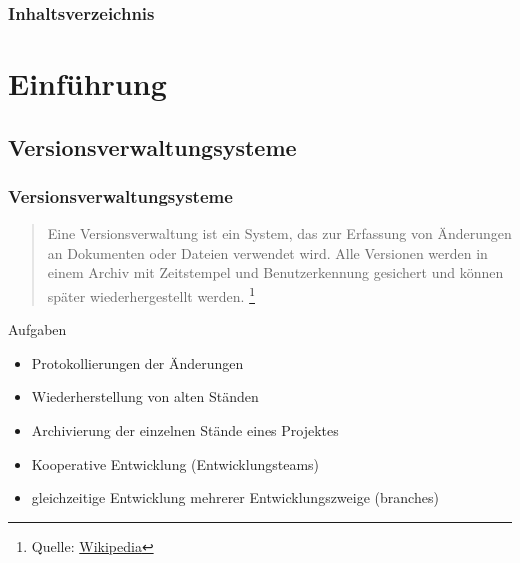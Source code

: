 \documentclass{beamer}
\begin{document}
\begin{frame}
\titlepage
\end{frame}

\begin{frame}
\frametitle{Inhaltsverzeichnis}\tableofcontents
\end{frame}


\section{Einführung} 
\subsection{Versionsverwaltungsysteme}
\begin{frame}\frametitle{Versionsverwaltungsysteme} 

\begin{quote}
Eine Versionsverwaltung ist ein System, das zur Erfassung von Änderungen an Dokumenten oder Dateien verwendet wird. Alle Versionen werden in einem Archiv mit Zeitstempel und Benutzerkennung gesichert und können später wiederhergestellt werden.
\footnote{Quelle: \href{http://de.wikipedia.org/wiki/Versionsverwaltung}{Wikipedia}}
\end{quote} 

Aufgaben
\begin{itemize}
\item  Protokollierungen der Änderungen
\item  Wiederherstellung von alten Ständen 
\item  Archivierung der einzelnen Stände eines Projektes
\item  Kooperative Entwicklung (Entwicklungsteams)
\item  gleichzeitige Entwicklung mehrerer Entwicklungszweige (branches)
\end{itemize} 
\end{frame}
\end{document}
